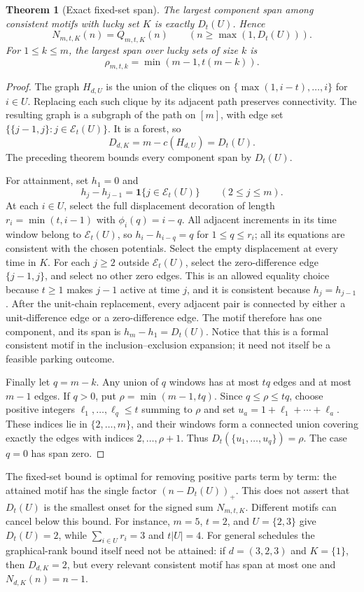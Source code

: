 \documentclass[11pt,a4paper]{article}
\newcommand{\ind}{\mathbf1}\newcommand{\spn}{\operatorname{span}}\newcommand{\MPF}{\operatorname{MPF}}\newcommand{\mpf}{\operatorname{mpf}}\newcommand{\Inj}{\operatorname{Inj}}
\newtheorem{theorem}{Theorem}[section]\newtheorem{lemma}[theorem]{Lemma}\newtheorem{corollary}[theorem]{Corollary}\newtheorem{proposition}[theorem]{Proposition}\theoremstyle{remark}\newtheorem{remark}[theorem]{Remark}\newtheorem{example}[theorem]{Example}
\begin{document}
\begin{theorem}[Exact fixed-set span]\label{thm:fixedspan}
The largest component span among consistent motifs with lucky set $K$
is exactly $D_t(U)$.  Hence
\[
 N_{m,t,K}(n)=Q_{m,t,K}(n)\qquad(n\ge\max(1,D_t(U))).
\]
For $1\le k\le m$, the largest span over lucky sets of size $k$ is
\[
 \rho_{m,t,k}=\min(m-1,t(m-k)).
\]
\end{theorem}
\begin{proof}
The graph $H_{d,U}$ is the union of the cliques on
$\{\max(1,i-t),\ldots,i\}$ for $i\in U$.
Replacing each such clique by its adjacent path preserves connectivity.
The resulting graph is a subgraph of the path on $[m]$, with edge set
$\{\{j-1,j\}:j\in\mathcal E_t(U)\}$.  It is a forest, so
\[
 D_{d,K}=m-c(H_{d,U})=D_t(U).
\]
The preceding theorem bounds every component span by $D_t(U)$.

For attainment, set $h_1=0$ and
\[
 h_j-h_{j-1}=\ind\{j\in\mathcal E_t(U)\}\qquad(2\le j\le m).
\]
At each $i\in U$, select the full displacement decoration of length
$r_i=\min(t,i-1)$ with $\phi_i(q)=i-q$.
All adjacent increments in its time window belong to $\mathcal E_t(U)$,
so $h_i-h_{i-q}=q$ for $1\le q\le r_i$; all its equations are consistent
with the chosen potentials.  Select the empty displacement at every
time in $K$.  For each $j\ge2$ outside $\mathcal E_t(U)$, select the
zero-difference edge $\{j-1,j\}$, and select no other zero edges.
This is an allowed equality choice because $t\ge1$ makes $j-1$ active
at time $j$, and it is consistent because $h_j=h_{j-1}$.
After the unit-chain replacement, every adjacent pair is connected by
either a unit-difference edge or a zero-difference edge.  The motif
therefore has one component, and its span is
$h_m-h_1=D_t(U)$.  Notice that this is a formal consistent motif in
the inclusion--exclusion expansion; it need not itself be a feasible
parking outcome.

Finally let $q=m-k$.  Any union of $q$ windows has at most $tq$ edges
and at most $m-1$ edges.  If $q>0$, put $\rho=\min(m-1,tq)$.
Since $q\le\rho\le tq$, choose positive integers
$\ell_1,\ldots,\ell_q\le t$ summing to $\rho$ and set
$u_a=1+\ell_1+\cdots+\ell_a$.  These indices lie in
$\{2,\ldots,m\}$, and their windows form a connected union covering
exactly the edges with indices $2,\ldots,\rho+1$.
Thus $D_t(\{u_1,\ldots,u_q\})=\rho$.  The case $q=0$ has span zero.
\end{proof}

The fixed-set bound is optimal for removing positive parts term by term:
the attained motif has the single factor $(n-D_t(U))_+$.
This does not assert that $D_t(U)$ is the smallest onset for the signed
sum $N_{m,t,K}$.  Different motifs can cancel below this bound.
For instance, $m=5$, $t=2$, and $U=\{2,3\}$ give
$D_t(U)=2$, while $\sum_{i\in U}r_i=3$ and $t|U|=4$.
For general schedules the graphical-rank bound itself need not be attained:
if $d=(3,2,3)$ and $K=\{1\}$, then $D_{d,K}=2$, but every relevant
consistent motif has span at most one and $N_{d,K}(n)=n-1$.
\end{document}
